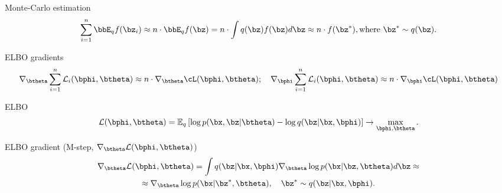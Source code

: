 \begin{frame}{Monte-Carlo estimation}
		\vspace{-0.3cm}
	\[
		\sum_{i=1}^n \bbE_q f(\bz_i) \approx n \cdot \bbE_q f(\bz) = n \cdot \int q(\bz) f(\bz) d\bz \approx n \cdot f(\bz^*), \text{where } \bz^* \sim q(\bz).
	\]
	\begin{block}{ELBO gradients}
			\vspace{-0.5cm}
		\[
			\nabla_{\btheta} \sum_{i=1}^n \mathcal{L}_i (\bphi, \btheta) \approx n \cdot \nabla_{\btheta} \cL (\bphi, \btheta); 
			\quad \nabla_{\bphi} \sum_{i=1}^n \mathcal{L}_i (\bphi, \btheta) \approx n \cdot \nabla_{\bphi} \cL (\bphi, \btheta) 
		\]
		\vspace{-0.3cm}
	\end{block}
	\begin{block}{ELBO}
		\vspace{-0.3cm}
		\[
		\mathcal{L} (\bphi, \btheta)  = \mathbb{E}_{q} \left[\log p(\bx, \bz | \btheta) - \log q(\bz | \bx , \bphi) \right] \rightarrow \max_{\bphi, \btheta}.
		\]
		\vspace{-0.5cm}
	\end{block}
	
	\begin{block}{ELBO gradient (M-step, $\nabla_{\btheta} \mathcal{L}(\bphi, \btheta)$)}
		\vspace{-0.5cm}
		\begin{multline*}
			\nabla_{\btheta} \mathcal{L} (\bphi, \btheta)
			= \int q(\bz|\bx, \bphi) \nabla_{\btheta}\log p(\bx|\bz, \btheta) d \bz \approx  \\
			\approx \nabla_{\btheta}\log p(\bx|\bz^*, \btheta), \quad \bz^* \sim q(\bz|\bx, \bphi).
		\end{multline*}
	\end{block}
\end{frame}
